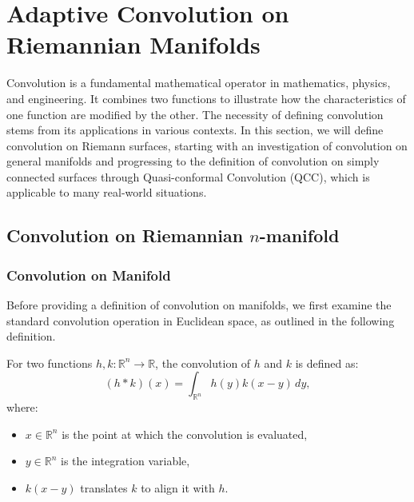 \section{Adaptive Convolution on Riemannian Manifolds}

Convolution is a fundamental mathematical operator in mathematics, physics, and engineering. It combines two functions to illustrate how the characteristics of one function are modified by the other. The necessity of defining convolution stems from its applications in various contexts. In this section, we will define convolution on Riemann surfaces, starting with an investigation of convolution on general manifolds and progressing to the definition of convolution on simply connected surfaces through Quasi-conformal Convolution (QCC), which is applicable to many real-world situations.

\subsection{Convolution on Riemannian $n$-manifold}

\subsubsection{Convolution on Manifold}
Before providing a definition of convolution on manifolds, we first examine the standard convolution operation in Euclidean space, as outlined in the following definition.

\begin{definition}[Convolution]
For two functions $h, k : \mathbb{R}^n \to \mathbb{R}$, the convolution of $h$ and $k$ is defined as:
\begin{equation}
(h \ast k)(x) = \int_{\mathbb{R}^n} h(y) k(x - y) \, dy,
\end{equation}
where:
\begin{itemize}
    \item $x \in \mathbb{R}^n$ is the point at which the convolution is evaluated,
    \item $y \in \mathbb{R}^n$ is the integration variable,
    \item $k(x - y)$ translates $k$ to align it with $h$.
\end{itemize}
\end{definition}

